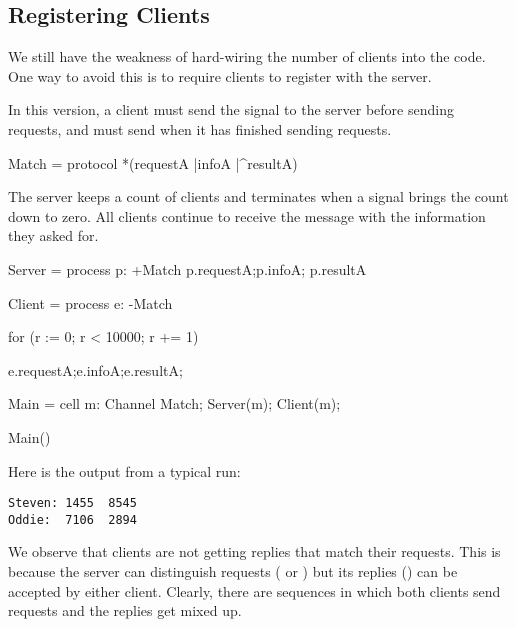 \subsection{Registering Clients}

We still have the weakness of hard-wiring the number of clients into the code.  One way to avoid this is to require clients to register with the server.

In this version, a client must send the signal  to the server before sending requests, and must send  when it has finished sending requests.
\begin{code}
Match = protocol { *(requestA |infoA |^resultA) }
\end{code}

The server keeps a count of clients and terminates when a  signal brings the count down to zero.  All clients continue to receive the message  with the information they asked for.
\begin{code}
Server = process p: +Match
{
    p.requestA;p.infoA; p.resultA
}

Client = process e: -Match
{
  for (r := 0; r < 10000; r += 1)
  {
        e.requestA;e.infoA;e.resultA;

  }
}

Main = cell
{
  m: Channel Match;
  Server(m);
  Client(m);
}

Main()
\end{code}

Here is the output from a typical run:
\begin{verbatim}
Steven: 1455  8545
Oddie:  7106  2894
\end{verbatim}

We observe that clients are not getting replies that match their requests.  This is because the server can distinguish requests ( or ) but its replies () can be accepted by either client.  Clearly, there are sequences in which both clients send requests and the replies get mixed up.


